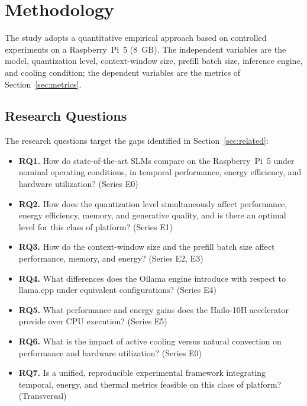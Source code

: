\documentclass[acmsmall,natbib=false]{acmart}
\begin{document}
\section{Methodology}\label{sec:methodology}

The study adopts a quantitative empirical approach based on controlled
experiments on a Raspberry~Pi~5 (8~GB). The independent variables are the
model, quantization level, context-window size, prefill batch size, inference
engine, and cooling condition; the dependent variables are the metrics of
Section~\ref{sec:metrics}.

\subsection{Research Questions}\label{sec:questions}

The research questions target the gaps identified in
Section~\ref{sec:related}:

\begin{itemize}
  \item \textbf{RQ1.} How do state-of-the-art SLMs compare on the
    Raspberry~Pi~5 under nominal operating conditions, in temporal
    performance, energy efficiency, and hardware utilization? (Series E0)
  \item \textbf{RQ2.} How does the quantization level simultaneously affect
    performance, energy efficiency, memory, and generative quality, and is
    there an optimal level for this class of platform? (Series E1)
  \item \textbf{RQ3.} How do the context-window size and the prefill batch
    size affect performance, memory, and energy? (Series E2, E3)
  \item \textbf{RQ4.} What differences does the Ollama engine introduce with
    respect to llama.cpp under equivalent configurations? (Series E4)
  \item \textbf{RQ5.} What performance and energy gains does the Hailo-10H
    accelerator provide over CPU execution? (Series E5)
  \item \textbf{RQ6.} What is the impact of active cooling versus natural
    convection on performance and hardware utilization? (Series E0)
  \item \textbf{RQ7.} Is a unified, reproducible experimental framework
    integrating temporal, energy, and thermal metrics feasible on this class
    of platform? (Transversal)
\end{itemize}
\end{document}
